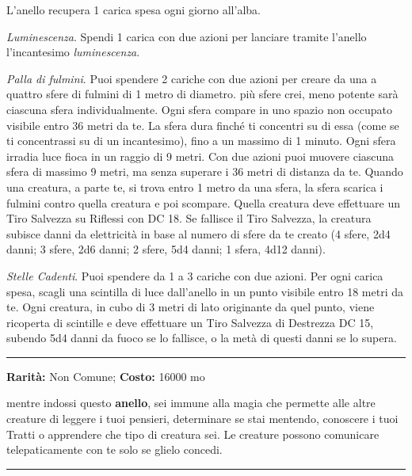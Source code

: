 \begin{multicols}{2}
L'anello recupera 1 carica spesa ogni giorno all'alba.

\emph{Luminescenza}. Spendi 1 carica con due azioni per lanciare tramite l'anello l'incantesimo \emph{luminescenza}.

\emph{Palla di fulmini}. Puoi spendere 2 cariche con due azioni per creare da una a quattro sfere di fulmini di 1 metro di diametro. più sfere crei, meno potente sarà ciascuna sfera individualmente.
Ogni sfera compare in uno spazio non occupato visibile entro 36 metri da te. La sfera dura finché ti concentri su di essa (come se ti concentrassi su di un incantesimo), fino a un massimo di 1 minuto. Ogni sfera irradia luce fioca in un raggio di 9 metri. Con due azioni puoi muovere ciascuna sfera di massimo 9 metri, ma senza superare i 36 metri di distanza da te. Quando una creatura, a parte te, si trova entro 1 metro da una sfera, la sfera scarica i fulmini contro quella creatura e poi scompare. Quella creatura deve effettuare un Tiro Salvezza su Riflessi con DC 18. Se fallisce il Tiro Salvezza, la creatura subisce danni da elettricità in base al numero di sfere da te creato (4 sfere, 2d4 danni; 3 sfere, 2d6 danni; 2 sfere, 5d4 danni; 1 sfera, 4d12 danni).

\emph{Stelle Cadenti}. Puoi spendere da 1 a 3 cariche con due azioni. Per ogni carica spesa, scagli una scintilla di luce dall'anello in un punto visibile entro 18 metri da te. Ogni creatura, in cubo di 3 metri di lato originante da quel punto, viene ricoperta di scintille e deve effettuare un Tiro Salvezza di Destrezza DC 15, subendo 5d4 danni da fuoco se lo fallisce, o la metà di questi danni se lo supera.

\smallskip\noindent\rule{\linewidth}{2pt}  \hypertarget{AnellodelloScudoMentale}{}\smallskip{}\noindent\label{AnellodelloScudoMentale}

\textbf{Rarità:} Non Comune; \textbf{Costo:} 16000 mo

mentre indossi questo \textbf{anello}, sei immune alla magia che permette alle altre creature di leggere i tuoi pensieri, determinare se stai mentendo, conoscere i tuoi Tratti o apprendere che tipo di creatura sei. Le creature possono comunicare telepaticamente con te solo se glielo concedi.

\smallskip\noindent\rule{\linewidth}{2pt}  \hypertarget{AnellodiCadutaPiuma}{}\smallskip{}\noindent\label{AnellodiCadutaPiuma}


\end{multicols}
